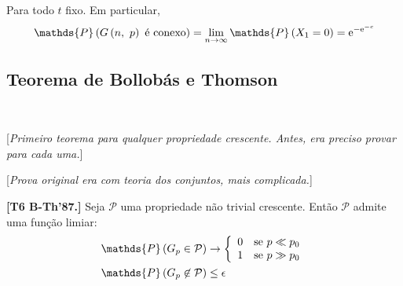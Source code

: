 Para todo $t$ fixo. Em particular,
\[
  \mathds{P}\left(G\left(n,\ p\vphantom{1j}\right) \text{ é conexo}\vphantom{1j}\right) = \lim_{n\rightarrow\infty} \mathds{P}\left(X_1=0\vphantom{1j}\right)=\mathrm{e}^{-\mathrm{e}^{-c}}
\]

\clearpage
\subsection{Teorema de Bollobás e Thomson}$ $\newline

[\textit{Primeiro teorema para qualquer propriedade crescente. Antes, era preciso provar para cada uma.}]

[\textit{Prova original era com teoria dos conjuntos, mais complicada.}]

\begin{teorema}
  \normalfont\textbf{[T6 B-Th'87.]}
  Seja $\mathcal{P}$ uma propriedade não trivial crescente. Então $\mathcal{P}$ admite uma função limiar:
  \vspace*{-\baselineskip}
  \begin{align*}
    \mathds{P}\left(G_p\in\mathcal{P}\vphantom{1j}\right)
      &\rightarrow \left\{\begin{array}{ll}
                      0 & \text{se } p \ll p_0  \\
                      1 & \text{se } p \gg p_0  \\
                    \end{array}\vphantom{1j}\right.                                                                  \\
    \mathds{P}\left(G_p\not\in\mathcal{P}\vphantom{1j}\right)
      &\leq\epsilon
  \end{align*}
\end{teorema}

